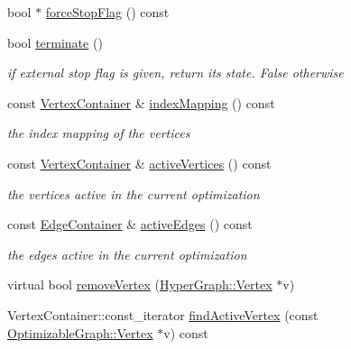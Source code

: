 \begin{DoxyCompactItemize}
\item 
bool $\ast$ \mbox{\hyperlink{classg2o_1_1_sparse_optimizer_aa3e5ee5263cd424aa763330d3a8a77c8}{force\+Stop\+Flag}} () const
\item 
bool \mbox{\hyperlink{classg2o_1_1_sparse_optimizer_ae592f525151d0cfb5bde3e7213f7ab11}{terminate}} ()
\begin{DoxyCompactList}\small\item\em if external stop flag is given, return its state. False otherwise \end{DoxyCompactList}\item 
const \mbox{\hyperlink{structg2o_1_1_optimizable_graph_a54f01b9b6071e65e6abeebe4afb29dec}{Vertex\+Container}} \& \mbox{\hyperlink{classg2o_1_1_sparse_optimizer_a93e11150d513979a6367518ecaf26e02}{index\+Mapping}} () const
\begin{DoxyCompactList}\small\item\em the index mapping of the vertices \end{DoxyCompactList}\item 
const \mbox{\hyperlink{structg2o_1_1_optimizable_graph_a54f01b9b6071e65e6abeebe4afb29dec}{Vertex\+Container}} \& \mbox{\hyperlink{classg2o_1_1_sparse_optimizer_a9843e19ec85c9f6598e52d7223e54e75}{active\+Vertices}} () const
\begin{DoxyCompactList}\small\item\em the vertices active in the current optimization \end{DoxyCompactList}\item 
const \mbox{\hyperlink{structg2o_1_1_optimizable_graph_a2b43e807ae6d61ef8749ca1ef7c25f62}{Edge\+Container}} \& \mbox{\hyperlink{classg2o_1_1_sparse_optimizer_a44edae09e8d4b2b1f7ed5b9d791f9459}{active\+Edges}} () const
\begin{DoxyCompactList}\small\item\em the edges active in the current optimization \end{DoxyCompactList}\item 
virtual bool \mbox{\hyperlink{classg2o_1_1_sparse_optimizer_a0fb2a5e2b250bf2530a600f6dcaad03f}{remove\+Vertex}} (\mbox{\hyperlink{classg2o_1_1_hyper_graph_1_1_vertex}{Hyper\+Graph\+::\+Vertex}} $\ast$v)
\item 
Vertex\+Container\+::const\+\_\+iterator \mbox{\hyperlink{classg2o_1_1_sparse_optimizer_a801bd46818f64a45aea124789d6d9511}{find\+Active\+Vertex}} (const \mbox{\hyperlink{classg2o_1_1_optimizable_graph_1_1_vertex}{Optimizable\+Graph\+::\+Vertex}} $\ast$v) const
\item 

\end{DoxyCompactItemize}
